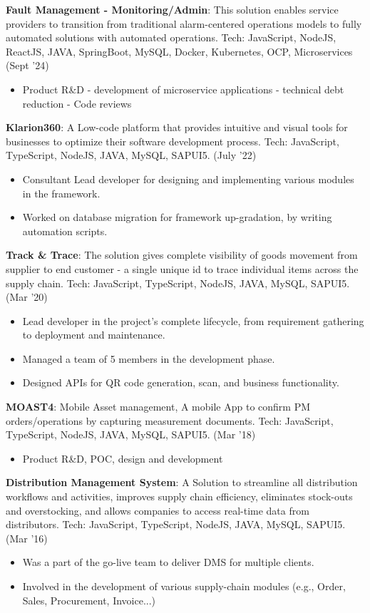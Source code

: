\documentclass[a4paper,20pt]{article}
\newcommand{\resumeItem}[2]{
	  \item\small{
	    \textbf{#1}{: #2 \vspace{-2pt}}
	  }
	}
\newcommand{\resumeItemOne}[1]{
	  \item\small{
	    {#1}{\vspace{-4pt}}
	  }
	}
\newcommand{\resumeSubItem}[2]{\resumeItem{#1}{#2}\vspace{-3pt}}
\newcommand{\resumeItemListStart}{\begin{itemize}}
\newcommand{\resumeItemListEnd}{\end{itemize}\vspace{-5pt}}
\begin{document}
	\resumeSubItem{Fault Management - Monitoring/Admin}{This solution enables service providers to transition from traditional alarm-centered operations models to fully automated solutions with automated operations. Tech: JavaScript, NodeJS, ReactJS, JAVA, SpringBoot, MySQL, Docker, Kubernetes, OCP, Microservices (Sept '24)}
\resumeItemListStart
		\resumeItemOne{Product R\&D - development of microservice applications - technical debt reduction - Code reviews}
\resumeItemListEnd
	\vspace{2pt}


	\resumeSubItem{Klarion360}{A Low-code platform that provides intuitive and visual tools for businesses to optimize their software development process. Tech: JavaScript, TypeScript, NodeJS, JAVA, MySQL, SAPUI5. (July '22)}
\resumeItemListStart
		\resumeItemOne{Consultant Lead developer for designing and implementing various modules in the framework.}
		\resumeItemOne{Worked on database migration for framework up-gradation, by writing automation scripts.}
\resumeItemListEnd
	\vspace{2pt}

	\resumeSubItem{Track \& Trace}{The solution gives complete visibility of goods movement from supplier to end customer - a single unique id to trace individual items across the supply chain. Tech: JavaScript, TypeScript, NodeJS, JAVA, MySQL, SAPUI5.  (Mar '20)}
\resumeItemListStart
		\resumeItemOne{Lead developer in the project's complete lifecycle, from requirement gathering to deployment and maintenance.}
		\resumeItemOne{Managed a team of 5 members in the development phase.}
		\resumeItemOne{Designed APIs for QR code generation, scan, and business functionality.}
\resumeItemListEnd
	\vspace{2pt}

	\resumeSubItem{MOAST4}{Mobile Asset management, A mobile App to confirm PM orders/operations by capturing measurement documents. Tech: JavaScript, TypeScript, NodeJS, JAVA, MySQL, SAPUI5. (Mar '18)}
\resumeItemListStart
		\resumeItemOne{Product R\&D, POC, design and development}
\resumeItemListEnd
	\vspace{2pt}

	\resumeSubItem{Distribution Management System}{A Solution to streamline all distribution workflows and activities, improves supply chain efficiency, eliminates stock-outs and overstocking, and allows companies to access real-time data from distributors. Tech: JavaScript, TypeScript, NodeJS, JAVA, MySQL, SAPUI5. (Mar '16)}
\resumeItemListStart
		\resumeItemOne{Was a part of the go-live team to deliver DMS for multiple clients.}
		\resumeItemOne{Involved in the development of various supply-chain modules (e.g., Order, Sales, Procurement, Invoice...)}
\resumeItemListEnd
\end{document}
